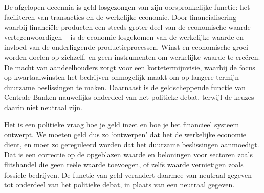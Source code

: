 
De afgelopen decennia is geld losgezongen van zijn oorspronkelijke functie: het faciliteren van transacties en de werkelijke economie. Door financialisering – waarbij financiële producten een steeds groter deel van de economische waarde vertegenwoordigen – is de economie losgekomen van de werkelijke waarde en invloed van de onderliggende productieprocessen. Winst en economische groei worden doelen op zichzelf, en geen instrumenten om werkelijke waarde te creëren. De macht van aandeelhouders zorgt voor een kortetermijnvisie, waarbij de focus op kwartaalwinsten het bedrijven onmogelijk maakt om op langere termijn duurzame beslissingen te maken. Daarnaast is de geldscheppende functie van Centrale Banken nauwelijks onderdeel van het politieke debat, terwijl de keuzes daarin niet neutraal zijn.

Het is een politieke vraag hoe je geld inzet en hoe je het financieel systeem ontwerpt. We moeten geld dus zo ‘ontwerpen’ dat het de werkelijke economie dient, en moet zo gereguleerd worden dat het duurzame beslissingen aanmoedigt. Dat is een correctie op de opgeblazen waarde en beloningen voor sectoren zoals flitshandel die geen reële waarde toevoegen, of zelfs waarde vernietigen zoals fossiele bedrijven. De functie van geld verandert daarmee van neutraal gegeven tot onderdeel van het politieke debat, in plaats van een neutraal gegeven.
